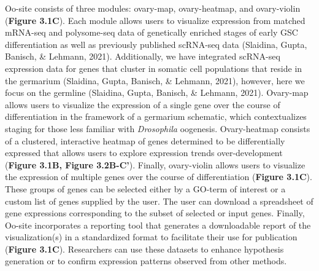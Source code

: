 \documentclass[12pt,oneside]{reedthesis}
\begin{document}
Oo-site consists of three modules: ovary-map, ovary-heatmap, and
ovary-violin (\textbf{Figure 3.1C}). Each module allows users to visualize
expression from matched mRNA-seq and polysome-seq data of genetically
enriched stages of early GSC differentiation as well as previously
published scRNA-seq data (Slaidina, Gupta, Banisch, \& Lehmann, 2021).
Additionally, we have integrated scRNA-seq expression data for genes
that cluster in somatic cell populations that reside in the germarium
(Slaidina, Gupta, Banisch, \& Lehmann, 2021), however, here we focus on the
germline (Slaidina, Gupta, Banisch, \& Lehmann, 2021). Ovary-map allows
users to visualize the expression of a single gene over the course of
differentiation in the framework of a germarium schematic, which
contextualizes staging for those less familiar with \emph{Drosophila}
oogenesis. Ovary-heatmap consists of a clustered, interactive heatmap of
genes determined to be differentially expressed that allows users to
explore expression trends over-development (\textbf{Figure 3.1B, Figure 3.2B-C'}). Finally, ovary-violin allows users to visualize the
expression of multiple genes over the course of differentiation
(\textbf{Figure 3.1C}). These groups of genes can be selected either by a
GO-term of interest or a custom list of genes supplied by the user. The
user can download a spreadsheet of gene expressions corresponding to the
subset of selected or input genes. Finally, Oo-site incorporates a
reporting tool that generates a downloadable report of the
visualization(s) in a standardized format to facilitate their use for
publication (\textbf{Figure 3.1C}). Researchers can use these datasets to
enhance hypothesis generation or to confirm expression patterns observed
from other methods.
\end{document}

